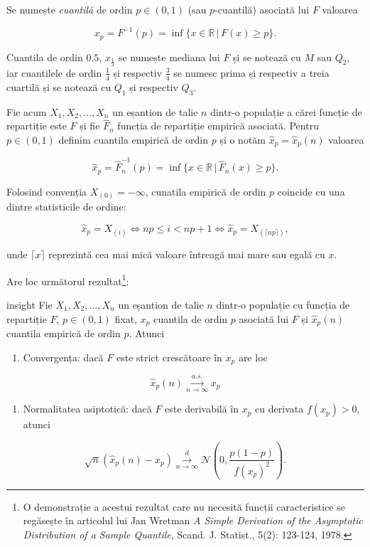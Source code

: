 \documentclass[]{article}
\providecommand{\tightlist}{%
  \setlength{\itemsep}{0pt}\setlength{\parskip}{0pt}}
\let\rmarkdownfootnote\footnote%
\def\footnote{\protect\rmarkdownfootnote}
\newenvironment{frshaded_insight*}{%
  \def\FrameCommand{\fboxrule=\FrameRule\fboxsep=\FrameSep \fcolorbox{framecolor_insight}{shadecolor_insight}}%
  \MakeFramed {\advance\hsize-\width \FrameRestore}}%
{\endMakeFramed}
\newenvironment{rmdblock_insight}[1]
  {\begin{frshaded_insight*}
  \begin{itemize}
  \renewcommand{\labelitemi}{
    \raisebox{-.7\height}[0pt][0pt]{
      {\setkeys{Gin}{width=2em,keepaspectratio}\texttt{[image: images/icons/\#1]}}
    }
  }
  \item
  }
  {
  \end{itemize}
  \end{frshaded_insight*}
  }
\newenvironment{rmdinsight}
  {\begin{rmdblock_insight}{insight}}
  {\end{rmdblock_insight}}
\begin{document}
Se numește \emph{cuantilă} de ordin \(p\in(0,1)\) (sau \(p\)-cuantilă)
asociată lui \(F\) valoarea

\[
  x_p = F^{-1}(p) = \inf\{x\in\mathbb{R}\,|\,F(x)\geq p\}.
\]

Cuantila de ordin \(0.5\), \(x_{\frac{1}{2}}\) se numește mediana lui
\(F\) și se notează cu \(M\) sau \(Q_2\), iar cuantilele de ordin
\(\frac{1}{4}\) și respectiv \(\frac{3}{4}\) se numesc prima și
respectiv a treia cuartilă și se notează cu \(Q_1\) și respectiv
\(Q_3\).

Fie acum \(X_1,X_2,\ldots,X_n\) un eșantion de talie \(n\) dintr-o
populație a cărei funcție de repartiție este \(F\) și fie \(\hat{F}_n\)
funcția de repartiție empirică asociată. Pentru \(p\in(0,1)\) definim
cuantila empirică de ordin \(p\) și o notăm \(\hat{x}_p = \hat{x}_p(n)\)
valoarea

\[
  \hat{x}_p = \hat{F}_n^{-1}(p) = \inf\{x\in\mathbb{R}\,|\,\hat{F}_n(x)\geq p\}.
\]

Folosind convenția \(X_{(0)}=-\infty\), cunatila empirică de ordin \(p\)
coincide cu una dintre statisticile de ordine:

\[
  \hat{x}_p = X_{(i)} \iff np\leq i< np+1 \iff \hat{x}_p = X_{(\lceil np \rceil)},
\]

unde \(\lceil x \rceil\) reprezintă cea mai mică valoare întreagă mai
mare sau egală cu \(x\).

Are loc următorul rezultat\footnote{O demonstrație a acestui rezultat
  care nu necesită funcții caracteristice se regăsește în articolul lui
  Jan Wretman \emph{A Simple Derivation of the Asymptotic Distribution
  of a Sample Quantile}, Scand. J. Statist., 5(2): 123-124, 1978.}:

\begin{rmdinsight}
Fie \(X_1,X_2,\ldots,X_n\) un eșantion de talie \(n\) dintr-o populație
cu funcția de repartiție \(F\), \(p\in(0,1)\) fixat, \(x_p\) cuantila de
ordin \(p\) asociată lui \(F\) și \(\hat{x}_p(n)\) cuantila empirică de
ordin \(p\). Atunci

\begin{enumerate}
\def\labelenumi{\arabic{enumi})}
\tightlist
\item
  Convergența: dacă \(F\) este strict crescătoare în \(x_p\) are loc
\end{enumerate}

\[
  \hat{x}_p(n) \overset{a.s.}{\underset{n\to\infty}\longrightarrow} x_p
\]

\begin{enumerate}
\def\labelenumi{\arabic{enumi})}
\setcounter{enumi}{1}
\tightlist
\item
  Normalitatea asiptotică: dacă \(F\) este derivabilă în \(x_p\) cu
  derivata \(f(x_p)>0\), atunci
\end{enumerate}

\[
  \sqrt{n}(\hat{x}_p(n) - x_p)\overset{d}{\underset{n\to\infty}\longrightarrow}\mathcal{N}\left(0,\frac{p(1-p)}{f(x_p)^2}\right).
\]
\end{rmdinsight}
\end{document}

